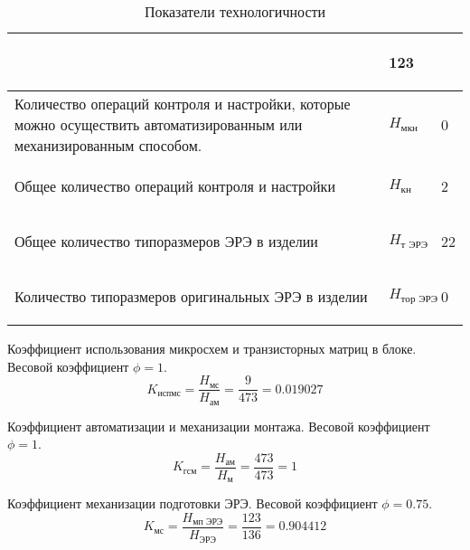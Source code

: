 \documentclass{article}
\begin{document}
\begin{table}
\begin{tabular}{|p{9cm}|p{3cm}|p{3cm}|}
        & \begin{center} 123 \end{center} \\
        \hline
        Количество операций контроля и настройки, которые можно осуществить
        автоматизированным или механизированным способом.
        & \begin{center} $H_{\text{мкн}}$ \end{center}
        & \begin{center} 0 \end{center} \\
        \hline
        Общее количество операций контроля и настройки
        & \begin{center} $H_{\text{кн}}$ \end{center}
        & \begin{center} 2 \end{center} \\
        \hline
        Общее количество типоразмеров ЭРЭ в изделии
        & \begin{center} $H_{\text{т ЭРЭ}}$ \end{center}
        & \begin{center} 22 \end{center} \\
        \hline
        Количество типоразмеров оригинальных ЭРЭ в изделии
        & \begin{center} $H_{\text{тор ЭРЭ}}$ \end{center}
        & \begin{center} 0 \end{center} \\
        \hline
    \end{tabular}
    \caption{Показатели технологичности}
    \label{technological_estaime_parametres}
\end{table}

Коэффициент использования микросхем и транзисторных матриц в блоке.
Весовой коэффициент $\phi = 1$.
$$
K_{\text{испмс}}
    = \frac{H_\text{мс}}
           {H_\text{ам}}
    = \frac{9}{473}
    = 0.019027
$$

Коэффициент автоматизации и механизации монтажа.
Весовой коэффициент $\phi = 1$.
$$
K_{\text{гсм}}
    = \frac{H_\text{ам}}
           {H_\text{м}}
    = \frac{473}{473}
    = 1
$$

Коэффициент механизации подготовки ЭРЭ.
Весовой коэффициент $\phi = 0.75$.
$$
K_{\text{мс}}
    = \frac{H_\text{мп ЭРЭ}}
           {H_\text{ЭРЭ}}
    = \frac{123}{136}
    = 0.904412
$$
\end{document}
